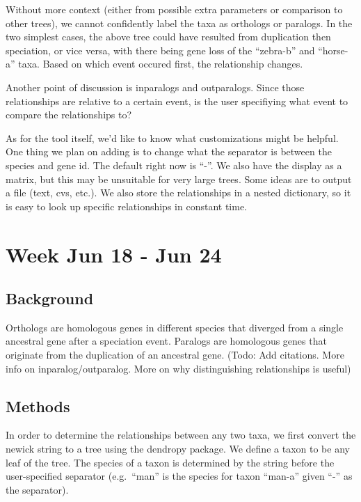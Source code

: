 \documentclass[
  11pt,
  letterpaper,
  oneside]{book}
\begin{document}
Without more context (either from possible extra parameters or
comparison to other trees), we cannot confidently label the taxa as
orthologs or paralogs. In the two simplest cases, the above tree could
have resulted from duplication then speciation, or vice versa, with
there being gene loss of the ``zebra-b'' and ``horse-a'' taxa. Based on
which event occured first, the relationship changes.

Another point of discussion is inparalogs and outparalogs. Since those
relationships are relative to a certain event, is the user specifiying
what event to compare the relationships to?

As for the tool itself, we'd like to know what customizations might be
helpful. One thing we plan on adding is to change what the separator is
between the species and gene id. The default right now is ``-''. We also
have the display as a matrix, but this may be unsuitable for very large
trees. Some ideas are to output a file (text, cvs, etc.). We also store
the relationships in a nested dictionary, so it is easy to look up
specific relationships in constant time.


\hypertarget{week-jun-18---jun-24}{%
\chapter{Week Jun 18 - Jun 24}\label{week-jun-18---jun-24}}

\hypertarget{background-1}{%
\section{Background}\label{background-1}}

Orthologs are homologous genes in different species that diverged from a
single ancestral gene after a speciation event. Paralogs are homologous
genes that originate from the duplication of an ancestral gene. (Todo:
Add citations. More info on inparalog/outparalog. More on why
distinguishing relationships is useful)

\hypertarget{methods-1}{%
\section{Methods}\label{methods-1}}

In order to determine the relationships between any two taxa, we first
convert the newick string to a tree using the dendropy package. We
define a taxon to be any leaf of the tree. The species of a taxon is
determined by the string before the user-specified separator
(e.g.~``man'' is the species for taxon ``man-a'' given ``-'' as the
separator).
\end{document}
